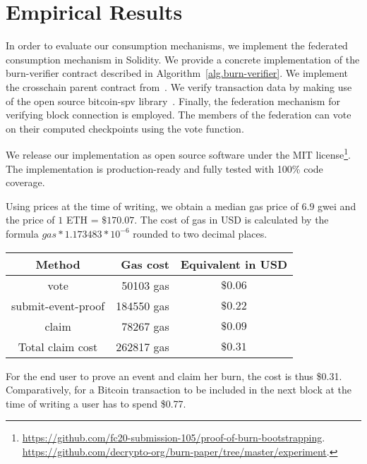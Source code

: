 \section{Empirical Results}
In order to evaluate our consumption mechanisms, we implement the federated consumption mechanism in Solidity. We provide a concrete implementation of the \textsf{burn-verifier} contract described in Algorithm~\ref{alg.burn-verifier}. We implement the \textsf{crosschain} parent contract from~\cite{pow-sidechains}. We verify transaction data by making use of the open source bitcoin-spv library~\cite{bitcoin-spv-library}. Finally, the federation mechanism for verifying block connection is employed. The members of the federation can vote on their computed checkpoints using the \textsf{vote} function.

We release our implementation as open source software under the MIT license\footnote{
    \ifanonymous
        \url{https://github.com/fc20-submission-105/proof-of-burn-bootstrapping}.
    \else
        \url{https://github.com/decrypto-org/burn-paper/tree/master/experiment}.
    \fi
}.
The implementation is production-ready and fully tested with 100\% code coverage.

Using prices at the time of writing, we obtain a median gas price of $6.9$ gwei and the price of $1$ ETH = $\$170.07$. The cost of gas in USD is calculated by the formula $gas * 1.173483 * 10^{-6}$ rounded to two decimal places.

\begin{center}
    \begin{tabular}{ |c|r|c| }
     \hline
     Method & Gas cost & Equivalent in USD \\
     \hline
     \textsf{vote}                  & 50103 gas  & $\$0.06$ \\
     \hline
     \textsf{submit-event-proof}    & 184550 gas & $\$0.22$ \\
     \textsf{claim}                 & 78267 gas  & $\$0.09$ \\
     Total claim cost               & 262817 gas & $\$0.31$ \\
     \hline
    \end{tabular}
\end{center}

For the end user to prove an event and claim her burn, the cost is thus \$0.31. Comparatively, for a Bitcoin transaction to be included in the next block at the time of writing a user has to spend \$0.77.

